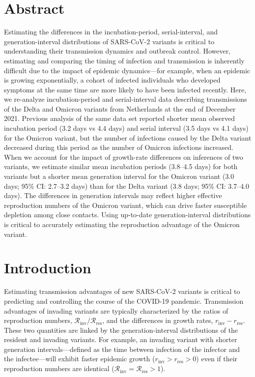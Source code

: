 \documentclass[12pt]{article}
\date{\today}
\newcommand{\Rx}[1]{\ensuremath{{\mathcal R}_{#1}}\xspace}
\newcommand{\Rres}{\Rx{\mathrm{res}}}
\newcommand{\Rinv}{\Rx{\mathrm{inv}}}
\newcommand{\rx}[1]{\ensuremath{{r}_{#1}}\xspace}
\newcommand{\rres}{\rx{\mathrm{res}}}
\newcommand{\rinv}{\rx{\mathrm{inv}}}
\begin{document}
\begin{flushleft}{
	\Large
	\textbf{}
}
\bigskip

\section*{Abstract}

Estimating the differences in the incubation-period, serial-interval, and generation-interval distributions of SARS-CoV-2 variants is critical to understanding their transmission dynamics and outbreak control.
However, estimating and comparing the timing of infection and transmission is inherently difficult due to the impact of epidemic dynamics---for example, when an epidemic is growing exponentially, a cohort of infected individuals who developed symptoms at the same time are more likely to have been infected recently.
Here, we re-analyze incubation-period and serial-interval data describing transmissions of the Delta and Omicron variants from Netherlands at the end of December 2021.
Previous analysis of the same data set reported shorter mean observed incubation period (3.2 days vs 4.4 days) and serial interval (3.5 days vs 4.1 days) for the Omicron variant, but the number of infections caused by the Delta variant decreased during this period as the number of Omicron infections increased.
When we account for the impact of growth-rate differences on inferences of two variants, we estimate similar mean incubation periods (3.8--4.5 days) for both variants but a shorter mean generation interval for the Omicron variant (3.0 days; 95\% CI: 2.7--3.2 days) than for the Delta variant (3.8 days; 95\% CI: 3.7--4.0 days).
The differences in generation intervals may reflect higher effective reproduction numbers of the Omicron variant, which can drive faster susceptible depletion among close contacts.
Using up-to-date generation-interval distributions is critical to accurately estimating the reproduction advantage of the Omicron variant.

\end{flushleft}

\pagebreak

\section{Introduction}

Estimating transmission advantages of new SARS-CoV-2 variants is critical to predicting and controlling the course of the COVID-19 pandemic.
Transmission advantages of invading variants are typically characterized by the ratios of reproduction numbers, $\Rinv/\Rres$, and the differences in growth rates, $\rinv-\rres$.
These two quantities are linked by the generation-interval distributions of the resident and invading variants.
For example, an invading variant with shorter generation intervals---defined as the time between infection of the infector and the infectee---will exhibit faster epidemic growth ($\rinv > \rres > 0$) even if their reproduction numbers are identical ($\Rinv = \Rres > 1$).
\end{document}
